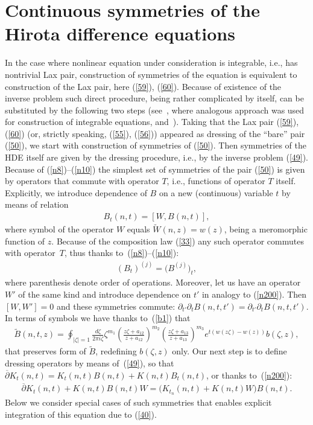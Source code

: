 \documentclass[pdftex]{sigma}
\numberwithin{equation}{section}
\begin{document}
\section{Continuous symmetries of the Hirota dif\/ference equations}\label{symm}

In the case where nonlinear equation under consideration is integrable, i.e., has nontrivial Lax pair, construction of symmetries of the equation is equivalent to construction of the Lax pair, here (\ref{59}), (\ref{60}). Because of existence of the inverse problem such direct procedure, being rather complicated by itself, can be substituted by the following two steps (see~\cite{Zakharov/Manakov}, where analogous approach was used for construction of integrable equations, and~\cite{Pogrebkov2000}). Taking that the Lax pair (\ref{59}), (\ref{60}) (or, strictly speaking, (\ref{55}), (\ref{56})) appeared as dressing of the ``bare'' pair (\ref{50}), we start with construction of symmetries of (\ref{50}). Then symmetries of the HDE itself are given by the dressing procedure, i.e., by the inverse problem (\ref{49}). Because of (\ref{n8})--(\ref{n10}) the simplest set of symmetries of the pair (\ref{50}) is given by operators that commute with operator $T$, i.e., functions of operator $T$ itself. Explicitly, we introduce dependence of $B$ on a new (continuous) variable $t$ by means of relation
\begin{gather}
 B_t(n,t)=[W,B(n,t)],\label{n200}
\end{gather}
where symbol of the operator $W$ equals $\widetilde{W}(n,z)=w(z)$, being a meromorphic function of $z$. Because of the composition law (\ref{33}) any such operator commutes with operator~$T$, thus thanks to~(\ref{n8})--(\ref{n10}):
\begin{gather}
(B_{t})^{(j)}=\big(B^{(j)}\big)_{t},\label{n2010}
\end{gather}
where parenthesis denote order of operations. Moreover, let us have an operator $W'$ of the same kind and introduce dependence on $t'$ in analogy to (\ref{n200}). Then $[W,W']=0$ and these symmetries commute: $\partial_{t'}\partial_{t}B(n,t,t')=\partial_{t'}\partial_{t}B(n,t,t')$. In terms of symbols we have thanks to~(\ref{b1}) that
\begin{gather*}
\widetilde{B}(n,t,z)=\oint_{|\zeta|=1}\frac{d\zeta}{2\pi i\zeta}\zeta^{m_1}\left(\frac{z\zeta+a_{12}}{z+a_{12}}\right)^{m_2}
\left(\frac{z\zeta+a_{13}}{z+a_{13}}\right)^{m_3}e_{}^{t(w(z\zeta)-w(z))}b(\zeta,z),%
\end{gather*}
that preserves form of $\widetilde{B}$, redef\/ining $b(\zeta,z)$ only. Our next step is to def\/ine dressing operators by means of~(\ref{49}), so that $\overline\partial{K}_{t}(n,t)=K_{t}(n,t)B(n,t)+K(n,t)B_{t}(n,t)$, or thanks to~(\ref{n200}):
\begin{gather}
 \overline\partial{K}_{t}(n,t)+K(n,t)B(n,t)W=\big(K_{t_n}(n,t)+K(n,t)W\big)B(n,t).\label{n202}
\end{gather}
Below we consider special cases of such symmetries that enables explicit integration of this equation due to (\ref{40}).
\end{document}
